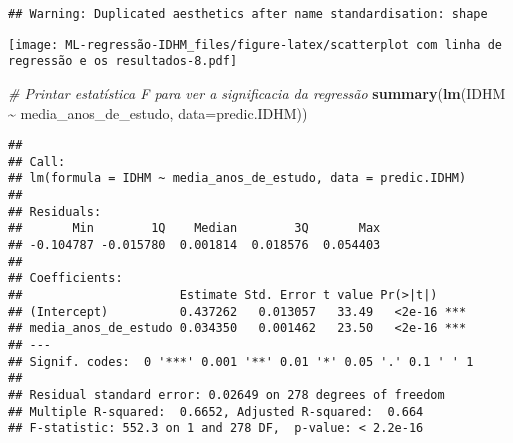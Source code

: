 \documentclass[
]{article}
\newenvironment{Shaded}{\begin{snugshade}}{\end{snugshade}}
\newcommand{\AttributeTok}[1]{\textcolor[rgb]{0.13,0.29,0.53}{#1}}
\newcommand{\CommentTok}[1]{\textcolor[rgb]{0.56,0.35,0.01}{\textit{#1}}}
\newcommand{\FunctionTok}[1]{\textcolor[rgb]{0.13,0.29,0.53}{\textbf{#1}}}
\newcommand{\NormalTok}[1]{#1}
\newcommand{\SpecialCharTok}[1]{\textcolor[rgb]{0.81,0.36,0.00}{\textbf{#1}}}
\begin{document}
\begin{verbatim}
## Warning: Duplicated aesthetics after name standardisation: shape
\end{verbatim}

\texttt{[image: ML-regressão-IDHM\_files/figure-latex/scatterplot com linha de regressão e os resultados-8.pdf]}

\begin{Shaded}
\begin{Highlighting}[]
\CommentTok{\# Printar estatística F para ver a significacia da regressão}
\FunctionTok{summary}\NormalTok{(}\FunctionTok{lm}\NormalTok{(IDHM }\SpecialCharTok{\textasciitilde{}}\NormalTok{ media\_anos\_de\_estudo, }\AttributeTok{data=}\NormalTok{predic.IDHM))}
\end{Highlighting}
\end{Shaded}

\begin{verbatim}
## 
## Call:
## lm(formula = IDHM ~ media_anos_de_estudo, data = predic.IDHM)
## 
## Residuals:
##       Min        1Q    Median        3Q       Max 
## -0.104787 -0.015780  0.001814  0.018576  0.054403 
## 
## Coefficients:
##                      Estimate Std. Error t value Pr(>|t|)    
## (Intercept)          0.437262   0.013057   33.49   <2e-16 ***
## media_anos_de_estudo 0.034350   0.001462   23.50   <2e-16 ***
## ---
## Signif. codes:  0 '***' 0.001 '**' 0.01 '*' 0.05 '.' 0.1 ' ' 1
## 
## Residual standard error: 0.02649 on 278 degrees of freedom
## Multiple R-squared:  0.6652, Adjusted R-squared:  0.664 
## F-statistic: 552.3 on 1 and 278 DF,  p-value: < 2.2e-16
\end{verbatim}
\end{document}
